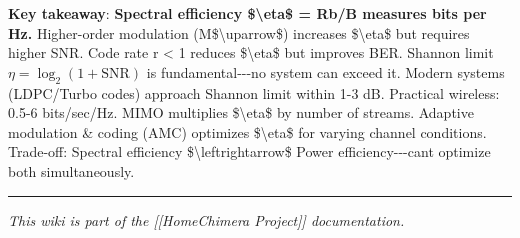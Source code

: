 \textbf{Key takeaway}: \textbf{Spectral efficiency
\$\textbackslash eta\$ = Rb/B measures bits per Hz.} Higher-order
modulation (M\$\textbackslash uparrow\$) increases
\$\textbackslash eta\$ but requires higher SNR. Code rate r \textless{}
1 reduces \$\textbackslash eta\$ but improves BER. Shannon limit
\(\eta = \log_2(1+\text{SNR})\) is fundamental-\/-\/-no system can
exceed it. Modern systems (LDPC/Turbo codes) approach Shannon limit
within 1-3 dB. Practical wireless: 0.5-6 bits/sec/Hz. MIMO multiplies
\$\textbackslash eta\$ by number of streams. Adaptive modulation \&
coding (AMC) optimizes \$\textbackslash eta\$ for varying channel
conditions. Trade-off: Spectral efficiency
\$\textbackslash leftrightarrow\$ Power
efficiency-\/-\/-can\textquotesingle t optimize both simultaneously.

\begin{center}\rule{0.5\linewidth}{0.5pt}\end{center}

\emph{This wiki is part of the {[}{[}Home\textbar Chimera Project{]}{]}
documentation.}
